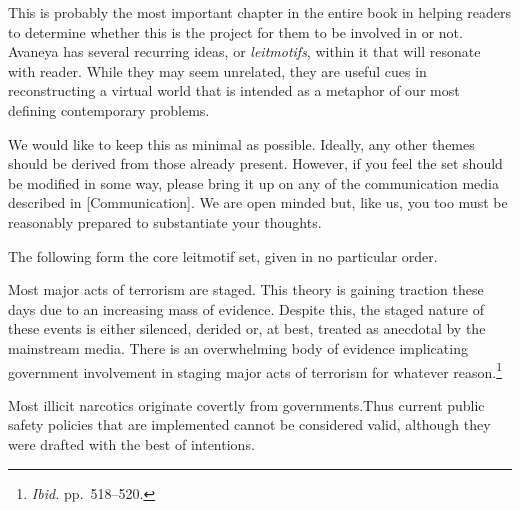 

This is probably the most important chapter in the entire book in helping readers to determine whether this is the project for them to be involved in or not. Avaneya has several recurring ideas, or {\it leitmotifs}, within it that will resonate with reader. While they may seem unrelated, they are useful cues in reconstructing a virtual world that is intended as a metaphor of our most defining contemporary problems.

We would like to keep this  as minimal as possible. Ideally, any other themes should be derived from those already present. However, if you feel the set should be modified in some way, please bring it up on any of the communication media described in [Communication]. We are open minded but, like us, you too must be reasonably prepared to substantiate your thoughts.

The following form the core leitmotif set, given in no particular order. 

\startitemize[4]

Most major acts of terrorism are staged. This theory is gaining traction these days due to an increasing mass of evidence. Despite this, the staged nature of these events is either silenced, derided or, at best, treated as anecdotal by the mainstream media. There is an overwhelming body of evidence implicating government involvement in staging major acts of terrorism for whatever reason.\footnotecite[extras={ p.~193.}][shirer1960]\footnote{{\it Ibid.} pp.~518--520.}\footnotecite[harrit2009]\footnotecite[northwoods]\footnotecite[king2010]\footnotecite[chossudovsky2005]


Most illicit narcotics originate covertly from governments. Thus current public safety policies that are implemented cannot be considered valid, although they were drafted with the best of intentions. 

